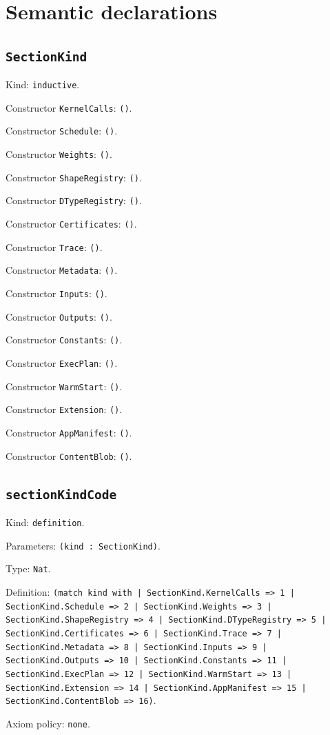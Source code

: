 \documentclass[11pt]{article}
\begin{document}
\section*{Semantic declarations}
\subsection*{\texttt{SectionKind}}
\noindent Kind: \texttt{inductive}.\par
\noindent Constructor \texttt{KernelCalls}: \texttt{()}.\par
\noindent Constructor \texttt{Schedule}: \texttt{()}.\par
\noindent Constructor \texttt{Weights}: \texttt{()}.\par
\noindent Constructor \texttt{ShapeRegistry}: \texttt{()}.\par
\noindent Constructor \texttt{DTypeRegistry}: \texttt{()}.\par
\noindent Constructor \texttt{Certificates}: \texttt{()}.\par
\noindent Constructor \texttt{Trace}: \texttt{()}.\par
\noindent Constructor \texttt{Metadata}: \texttt{()}.\par
\noindent Constructor \texttt{Inputs}: \texttt{()}.\par
\noindent Constructor \texttt{Outputs}: \texttt{()}.\par
\noindent Constructor \texttt{Constants}: \texttt{()}.\par
\noindent Constructor \texttt{ExecPlan}: \texttt{()}.\par
\noindent Constructor \texttt{WarmStart}: \texttt{()}.\par
\noindent Constructor \texttt{Extension}: \texttt{()}.\par
\noindent Constructor \texttt{AppManifest}: \texttt{()}.\par
\noindent Constructor \texttt{ContentBlob}: \texttt{()}.\par
\subsection*{\texttt{sectionKindCode}}
\noindent Kind: \texttt{definition}.\par
\noindent Parameters: \texttt{(kind : SectionKind)}.\par
\noindent Type: \texttt{Nat}.\par
\noindent Definition: \texttt{(match kind with | SectionKind.KernelCalls => 1 | SectionKind.Schedule => 2 | SectionKind.Weights => 3 | SectionKind.ShapeRegistry => 4 | SectionKind.DTypeRegistry => 5 | SectionKind.Certificates => 6 | SectionKind.Trace => 7 | SectionKind.Metadata => 8 | SectionKind.Inputs => 9 | SectionKind.Outputs => 10 | SectionKind.Constants => 11 | SectionKind.ExecPlan => 12 | SectionKind.WarmStart => 13 | SectionKind.Extension => 14 | SectionKind.AppManifest => 15 | SectionKind.ContentBlob => 16)}.\par
\noindent Axiom policy: \texttt{none}.\par
\end{document}
